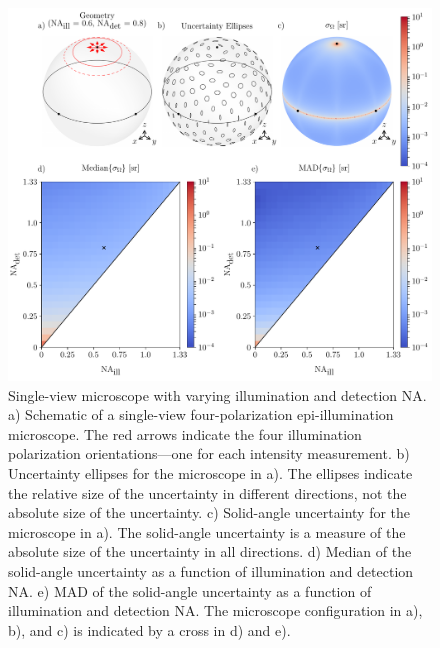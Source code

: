 \documentclass[10pt]{article}
\begin{document}
\begin{figure}[htbp]
\centering\includegraphics[width=\textwidth]{single-arm}
\caption{Single-view microscope with varying illumination and detection NA. a)
  Schematic of a single-view four-polarization epi-illumination microscope. The
  red arrows indicate the four illumination polarization orientations---one for
  each intensity measurement. b) Uncertainty ellipses for the microscope in
  a). The ellipses indicate the relative size of the uncertainty in different
  directions, not the absolute size of the uncertainty. c) Solid-angle
  uncertainty for the microscope in a). The solid-angle uncertainty is a measure
  of the absolute size of the uncertainty in all directions. d) Median of the
  solid-angle uncertainty as a function of illumination and detection NA. e) MAD
  of the solid-angle uncertainty as a function of illumination and detection
  NA. The microscope configuration in a), b), and c) is indicated by a cross in
  d) and e).}
\label{fig:single-arm}
\end{figure}
\end{document}
